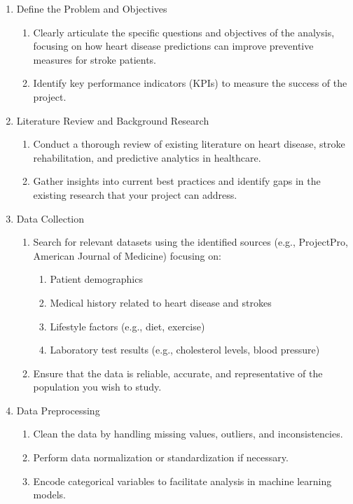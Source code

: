 \documentclass[runningheads]{llncs}
\begin{document}
    \begin{enumerate}
\item Define the Problem and Objectives
\begin{enumerate}
    \item Clearly articulate the specific questions and objectives of the analysis, focusing on how heart disease predictions can improve preventive measures for stroke patients.
    \item Identify key performance indicators (KPIs) to measure the success of the project. 
\end{enumerate}
\item  Literature Review and Background Research
\begin{enumerate}
    \item Conduct a thorough review of existing literature on heart disease, stroke rehabilitation, and predictive analytics in healthcare. 
    \item Gather insights into current best practices and identify gaps in the existing research that your project can address. 
\end{enumerate}
\item Data Collection
\begin{enumerate}
    \item Search for relevant datasets using the identified sources (e.g., ProjectPro, American Journal of Medicine) focusing on: 
    \begin{enumerate}
        \item Patient demographics 
        \item Medical history related to heart disease and strokes 
        \item Lifestyle factors (e.g., diet, exercise) 
        \item Laboratory test results (e.g., cholesterol levels, blood pressure) 
    \end{enumerate}
    \item Ensure that the data is reliable, accurate, and representative of the population you wish to study. 
\end{enumerate}
\item Data Preprocessing
    \begin{enumerate}
        \item Clean the data by handling missing values, outliers, and inconsistencies. 
        \item Perform data normalization or standardization if necessary. 
        \item Encode categorical variables to facilitate analysis in machine learning models. 

\end{enumerate}
\end{enumerate}
\end{document}
